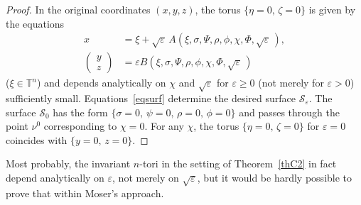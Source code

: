 \documentclass[12pt,reqno]{amsart}
\theoremstyle{definition}
\begin{document}
\begin{proof}
In the original coordinates $(x,y,z)$, the torus $\{\eta=0, \, \zeta=0\}$ is
given by the equations
\begin{align*}
x &= \xi+{{\sqrt{\varepsilon}}\,} A(\xi,\sigma,\Psi,\rho,\phi,\chi,\Phi,{{\sqrt{\varepsilon}}\,}), \\
\begin{pmatrix} y \\ z \end{pmatrix} &=
{\varepsilon} B(\xi,\sigma,\Psi,\rho,\phi,\chi,\Phi,{{\sqrt{\varepsilon}}\,})
\end{align*}
($\xi\in{\mathbb T}^n$) and depends analytically on $\chi$ and ${\sqrt{\varepsilon}}$ for
${\varepsilon}{\geqslant} 0$ (not merely for ${\varepsilon}>0$) sufficiently small.
Equations~\eqref{eqsurf} determine the desired surface ${\mathcal S}_{\varepsilon}$. The
surface ${\mathcal S}_0$ has the form $\{\sigma=0, \, \psi=0, \, \rho=0, \, \phi=0\}$
and passes through the point $\nu^0$ corresponding to $\chi=0$. For any
$\chi$, the torus $\{\eta=0, \, \zeta=0\}$ for ${\varepsilon}=0$ coincides with
$\{y=0, \, z=0\}$.
\end{proof}

Most probably, the invariant $n$-tori in the setting of Theorem~\ref{thC2} in
fact depend analytically on ${\varepsilon}$, not merely on ${\sqrt{\varepsilon}}$, but it would be
hardly possible to prove that within Moser's approach.
\end{document}

